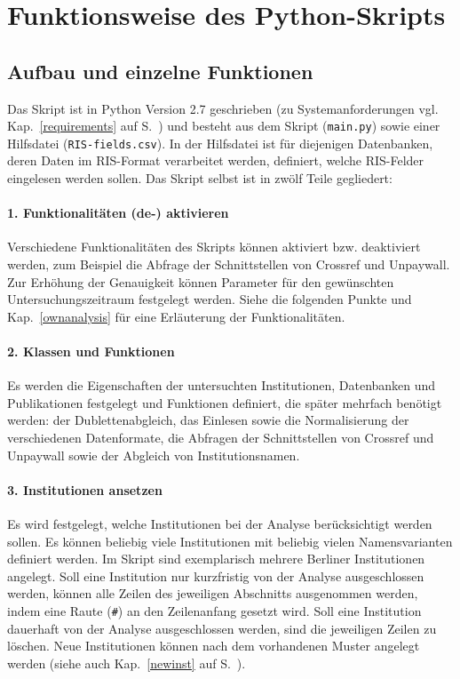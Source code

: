\section{Funktionsweise des Python-Skripts}
\label{funktionsweise}
\subsection{Aufbau und einzelne Funktionen}
Das Skript ist in Python Version 2.7 geschrieben (zu Systemanforderungen vgl. Kap.~\ref{requirements} auf S.~\pageref{requirements}) und besteht aus dem Skript (\texttt{main.py}) sowie einer Hilfsdatei (\texttt{RIS-fields.csv}). In der Hilfsdatei ist für diejenigen Datenbanken, deren Daten im RIS-Format verarbeitet werden, definiert, welche RIS-Felder eingelesen werden sollen. Das Skript selbst ist in zwölf Teile gegliedert:

\paragraph{1. Funktionalitäten (de-) aktivieren}
Verschiedene Funktionalitäten des Skripts können aktiviert bzw. deaktiviert werden, zum Beispiel die Abfrage der Schnittstellen von Crossref und Unpaywall. Zur Erhöhung der Genauigkeit können Parameter für den gewünschten Untersuchungszeitraum festgelegt werden. Siehe die folgenden Punkte und Kap.~\ref{ownanalysis} für eine Erläuterung der Funktionalitäten.

\paragraph{2. Klassen und Funktionen} \label{func-def}
Es werden die Eigenschaften der untersuchten Institutionen, Datenbanken und Publikationen festgelegt und Funktionen definiert, die später mehrfach benötigt werden: der Dublettenabgleich, das Einlesen sowie die Normalisierung der verschiedenen Datenformate, die Abfragen der Schnittstellen von Crossref und Unpaywall sowie der Abgleich von Institutionsnamen.

\paragraph{3. Institutionen ansetzen} \label{inst-def}
Es wird festgelegt, welche Institutionen bei der Analyse berücksichtigt werden sollen. Es können beliebig viele Institutionen mit beliebig vielen Namensvarianten definiert werden. Im Skript sind exemplarisch mehrere Berliner Institutionen angelegt. Soll eine Institution nur kurzfristig von der Analyse ausgeschlossen werden, können alle Zeilen des jeweiligen Abschnitts ausgenommen werden, indem eine Raute (\texttt{\#}) an den Zeilenanfang gesetzt wird. Soll eine Institution dauerhaft von der Analyse ausgeschlossen werden, sind die jeweiligen Zeilen zu löschen. Neue Institutionen können nach dem vorhandenen Muster angelegt werden (siehe auch Kap.~\ref{newinst}  auf S.~\pageref{newinst}).


